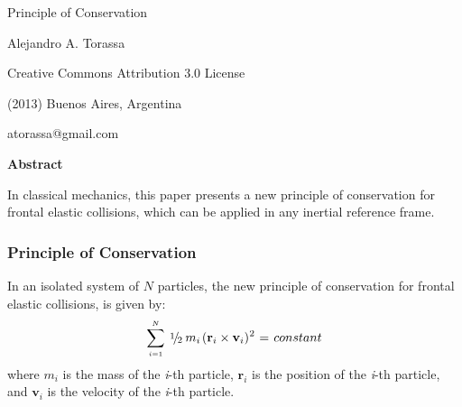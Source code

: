 \documentclass[10pt]{article}
\newcommand{\mM}{m}
\newcommand{\ri}{_i}
\newcommand{\vR}{\mathbf{r}}
\newcommand{\vV}{\mathbf{v}}
\newcommand{\med}{\raise.5ex\hbox{$\scriptstyle 1$}\kern-.15em/\kern-.15em\lower.25ex\hbox{$\scriptstyle 2$}}
\begin{document}
\begin{center}

{\LARGE Principle of Conservation}

\bigskip \medskip

Alejandro A. Torassa

\bigskip \medskip

\footnotesize

Creative Commons Attribution 3.0 License

(2013) Buenos Aires, Argentina

atorassa@gmail.com

\bigskip \smallskip

\small

{\bf Abstract}

\bigskip

\parbox{81mm}{In classical mechanics, this paper presents a new principle of conservation for frontal elastic collisions, which can be applied in any inertial reference frame.}

\end{center}

\normalsize

\vspace{-0.30em}

{\centering\subsubsection*{Principle of Conservation}}

\vspace{+0.75em}

\par In an isolated system of $N$ particles, the new principle of conservation for frontal elastic collisions, is given by:
\begin{eqnarray*}
\sum^{\scriptscriptstyle N}_{\scriptscriptstyle i = 1} \hspace{+0.24em} \med \hspace{+0.24em} \mM\ri \hspace{+0.12em} (\vR\ri \times \vV\ri)^{\hspace{+0.03em} 2} \hspace{+0.06em} = \hspace{+0.09em} constant
\end{eqnarray*}
\noindent where $\mM\ri$ is the mass of the \textit{i}-th particle, $\vR\ri$ is the position of the \textit{i}-th particle, and $\vV\ri$ is the velocity of the \textit{i}-th particle.
\end{document}
